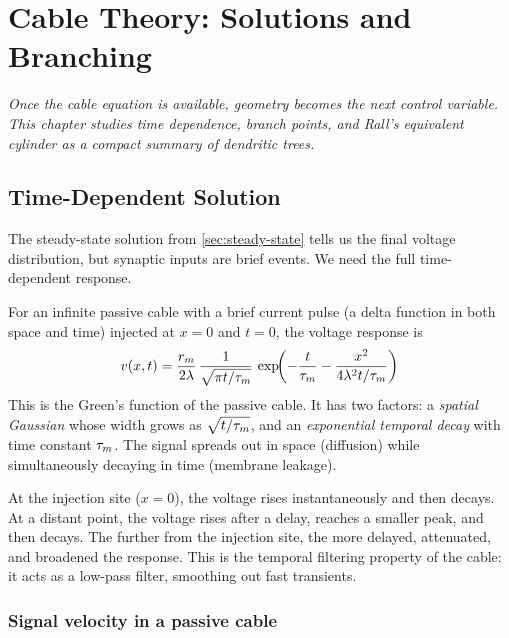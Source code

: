 \chapter{Cable Theory: Solutions and Branching}
\label{ch:cable-branching}

\textit{Once the cable equation is available, geometry becomes the next control variable. This chapter studies time dependence, branch points, and Rall's equivalent cylinder as a compact summary of dendritic trees.}

\section{Time-Dependent Solution}
\label{sec:time-dependent}

The steady-state solution from \cref{sec:steady-state} tells us the final voltage distribution, but synaptic inputs are brief events. We need the full time-dependent response.

For an infinite passive cable with a brief current pulse (a delta function in both space and time) injected at $x = 0$ and $t = 0$, the voltage response is
%
\begin{equation}
  v(x, t) = \frac{r_m}{2\lambda}\,\frac{1}{\sqrt{\pi t/\tau_m}}\,
    \exp\!\biggl(-\frac{t}{\tau_m} - \frac{x^2}{4\lambda^2 t/\tau_m}\biggr)
  \label{eq:cable-greens}
\end{equation}
%
This is the Green's function of the passive cable. It has two factors: a \emph{spatial Gaussian} whose width grows as $\sqrt{t/\tau_m}$, and an \emph{exponential temporal decay} with time constant $\tau_m$. The signal spreads out in space (diffusion) while simultaneously decaying in time (membrane leakage).

At the injection site ($x = 0$), the voltage rises instantaneously and then decays. At a distant point, the voltage rises after a delay, reaches a smaller peak, and then decays. The further from the injection site, the more delayed, attenuated, and broadened the response. This is the temporal filtering property of the cable: it acts as a low-pass filter, smoothing out fast transients.

\subsection{Signal velocity in a passive cable}

